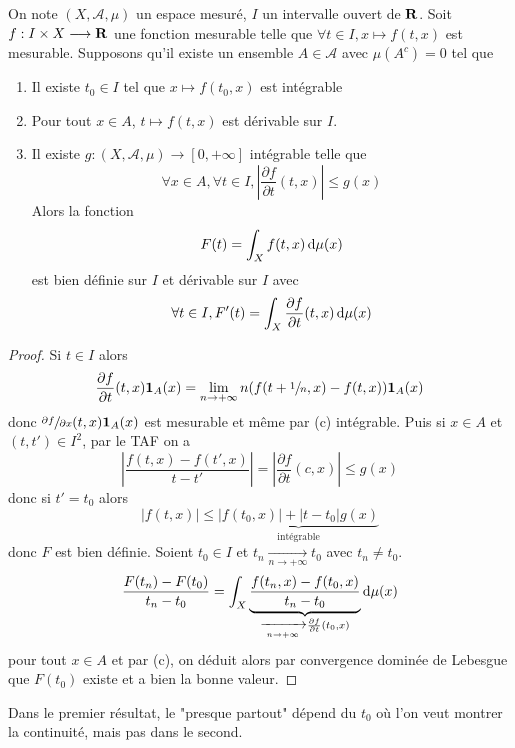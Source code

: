 \begin{thm}
    On note $(X, \mathcal  A, \mu)$ un espace mesuré, $I$ un intervalle ouvert de  $\mathbf R$. Soit $f:I\times X \longrightarrow \mathbf R$ une fonction mesurable telle que $\forall  t \in I, x \longmapsto f(t, x)$ est mesurable. Supposons qu'il existe un ensemble $A \in  \mathcal  A$ avec $\mu(A^c)=0$ tel que  \begin{enumerate}[label=(\alph*)]
        \item Il existe $t_0 \in  I$ tel que $x\longmapsto f(t_0, x)$ est intégrable
        \item Pour tout $x \in  A$, $t \longmapsto f(t, x)$ est dérivable sur $I$.
        \item Il existe  $g:(X, \mathcal  A,  \mu)\longrightarrow [0, +\infty]$ intégrable telle que \[
                \forall  x \in  A, \forall  t \in  I, \left| \frac{\partial f}{\partial t}(t, x) \right|\leq g(x)
        \] 
        Alors la fonction \[
            F(t)=\int_Xf(t, x)\mathop{}\!\mathrm d\mu(x)
        \] 
        est bien définie sur $I$ et dérivable sur  $I$ avec  \[
            \forall  t \in  I, F'(t)=\int_X \frac{\partial f}{\partial t}(t, x)\mathop{}\!\mathrm d\mu(x)
        \] 
    \end{enumerate}
\end{thm}

\begin{proof}
Si $t \in  I$ alors \[
    \frac{\partial f}{\partial t}(t, x)\bm{1}_A(x)=\lim_{n\to +\infty} n(f(t+\sfrac1n, x)-f(t, x))\bm{1}_A(x)
\] 
donc $\sfrac{\partial f}{\partial x}(t, x)\bm{1}_A(x)$ est mesurable et même par (c) intégrable. Puis si $x \in  A$ et $(t, t') \in  I^2 $, par le TAF on a \[
    \left| \frac{f(t, x)-f(t', x)}{t-t'} \right|= \left| \frac{\partial f}{\partial t}(c, x) \right|\leq g(x)
\]
donc si $t'=t_0$ alors \[
    |f(t, x)|\leq \underbrace{|f(t_0, x)|+|t-t_0|g(x)}_{\text{intégrable}}
\] 
donc $F$ est bien définie. Soient  $t_0 \in  I$ et $t_n \xrightarrow[n\to+\infty]{}t_0$ avec $t_n \neq  t_0$. \[
    \frac{F(t_n)-F(t_0)}{t_n-t_0}=\int_X\underbrace{\frac{f(t_n, x)-f(t_0,x)}{t_n-t_0}}_{\xrightarrow[n\to+\infty]{}\frac{\partial f}{\partial t}(t_0, x)}\mathop{}\!\mathrm d\mu(x)
\]
pour tout $x \in  A$ et par (c), on déduit alors par convergence dominée de Lebesgue que $F(t_0)$ existe et a bien la bonne valeur.
\end{proof}

\begin{rem}
Dans le premier résultat, le "presque partout" dépend du $t_0$ où l'on veut montrer la continuité, mais pas dans le second.
\end{rem}

